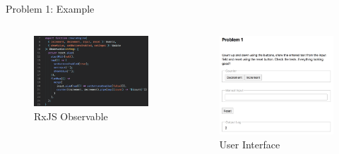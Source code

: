 \documentclass[aspectratio=169]{beamer}
\begin{document}
\begin{frame}{Problem 1: Example}
    \begin{columns}[b]
        \begin{column}{.5\linewidth}
            \begin{figure}
                \centering
                \includegraphics[width=.9\linewidth]{figures/problem1-code.png}
                \caption{RxJS Observable}
            \end{figure}
        \end{column}
        \begin{column}{.5\linewidth}
            \begin{figure}
                \centering
                \includegraphics[width=.9\linewidth]{figures/problem1-ui.png}
                \caption{User Interface}
            \end{figure}
        \end{column}
    \end{columns}
\end{frame}
\end{document}

